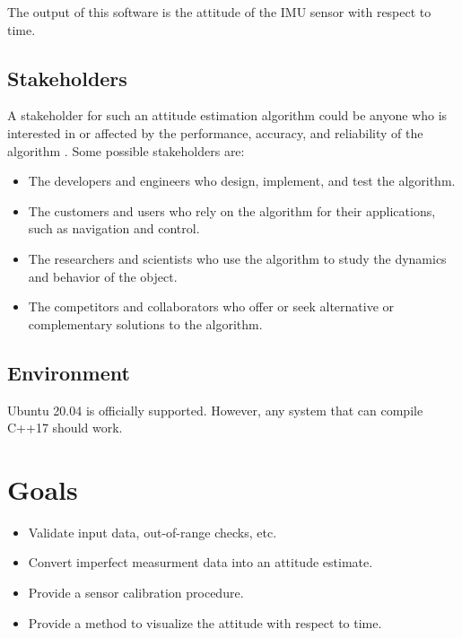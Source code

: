 \documentclass{article}
\begin{document}
The output of this software is the attitude of the IMU sensor with respect to time.



\subsection{Stakeholders}

A stakeholder for such an attitude estimation algorithm could be anyone who is interested in or affected by the performance, accuracy, and reliability of the algorithm \cite{stake}. Some possible stakeholders are:
\begin{itemize}
    \item The developers and engineers who design, implement, and test the algorithm.
    \item The customers and users who rely on the algorithm for their applications, such as navigation and control.
    \item The researchers and scientists who use the algorithm to study the dynamics and behavior of the object.
    \item The competitors and collaborators who offer or seek alternative or complementary solutions to the algorithm.
\end{itemize}
    

\subsection{Environment}

Ubuntu 20.04 is officially supported. However, any system that can compile C++17 should work.


\section{Goals}


\begin{itemize}
    \item Validate input data, out-of-range checks, etc.
    \item Convert imperfect measurment data into an attitude estimate.
    \item Provide a sensor calibration procedure.
    \item Provide a method to visualize the attitude with respect to time.
\end{itemize}
\end{document}
